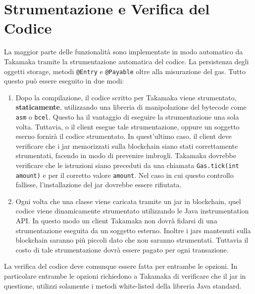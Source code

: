 \section{Strumentazione e Verifica del Codice}
La maggior parte delle funzionalità sono implementate in modo automatico da Takamaka tramite la strumentazione automatica del codice. La persistenza degli oggetti storage, metodi \lstinline|@Entry| e \lstinline|@Payable| oltre alla misurazione del gas. Tutto questo può essere eseguito in due modi:
\begin{enumerate}
	\item Dopo la compilazione, il codice scritto per Takamaka viene strumentato, \textbf{staticamente}, utilizzando una libreria di manipolazione del bytecode come \lstinline|asm| o \lstinline|bcel|. Questo ha il vantaggio di eseguire la strumentazione una sola volta. Tuttavia, o il client esegue tale strumentazione, oppure un soggetto eserno fornirà il codice strumentato. In quest'ultimo caso, il client deve verificare che i jar memorizzati sulla blockchain siano stati correttamente strumentati, facendo in modo di prevenire imbrogli. Takamaka dovrebbe verificare che le istruzioni siano preceduti da una chiamata \lstinline|Gas.tick(int amount)| e per il corretto valore \lstinline|amount|. Nel caso in cui questo controllo fallisse, l'installazione del jar dovrebbe essere rifiutata.
	\item Ogni volta che una classe viene caricata tramite un jar in blockchain, quel codice viene dinamicamente strumentato utilizzando le Java instrumentation API. In questo modo un client Takamaka non dovrà fidarsi di una strumentazione eseguita da un soggetto esterno. Inoltre i jars mantenuti sulla blockchain saranno più piccoli dato che non saranno strumentati. Tuttavia il costo di tale strumentazione dovrà essere pagato per ogni transazione.
\end{enumerate}
%
La verifica del codice deve comunque essere fatta per entrambe le opzioni. In particolare entrambe le opzioni richiedono a Takamaka di verificare che il jar in questione, utilizzi solamente i metodi white-listed della libreria Java standard.

